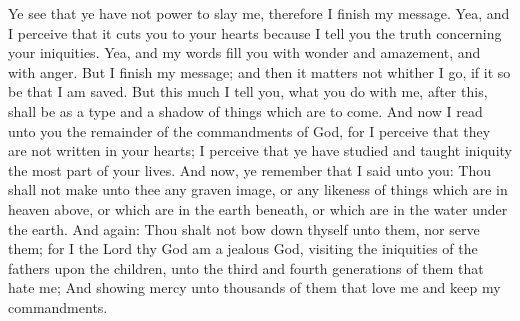 Ye see that ye have not power to slay me, therefore I finish my message. Yea, and I perceive that it cuts you to your hearts because I tell you the truth concerning your iniquities.
\bverse \iffalse Yea, and my words fill you with wonder and amazement, and with anger. \fi
Yea, and my words fill you with wonder and amazement, and with anger.
\bverse \iffalse But I finish my message; and then it matters not whither I go, if it so be that I am saved. \fi
But I finish my message; and then it matters not whither I go, if it so be that I am saved.
\bverse \iffalse But this much I tell you, what you do with me, after this, shall be as a type and a shadow of things which are to come. \fi
But this much I tell you, what you do with me, after this, shall be as a type and a shadow of things which are to come.
\bverse \iffalse And now I read unto you the remainder of the commandments of God, for I perceive that they are not written in your hearts; I perceive that ye have studied and taught iniquity the most part of your lives. \fi
And now I read unto you the remainder of the commandments of God, for I perceive that they are not written in your hearts; I perceive that ye have studied and taught iniquity the most part of your lives.
\bverse \iffalse And now, ye remember that I said unto you: Thou shall not make unto thee any graven image, or any likeness of things which are in heaven above, or which are in the earth beneath, or which are in the water under the earth. \fi
And now, ye remember that I said unto you: Thou shall not make unto thee any graven image, or any likeness of things which are in heaven above, or which are in the earth beneath, or which are in the water under the earth.
\bverse \iffalse And again: Thou shalt not bow down thyself unto them, nor serve them; for I the Lord thy God am a jealous God, visiting the iniquities of the fathers upon the children, unto the third and fourth generations of them that hate me; \fi
And again: Thou shalt not bow down thyself unto them, nor serve them; for I the Lord thy God am a jealous God, visiting the iniquities of the fathers upon the children, unto the third and fourth generations of them that hate me;
\bverse \iffalse And showing mercy unto thousands of them that love me and keep my commandments. \fi
And showing mercy unto thousands of them that love me and keep my commandments.
\bverse \iffalse Thou shalt not take the name of the Lord thy God in vain; for the Lord will not hold him guiltless that taketh his name in vain. \fi
